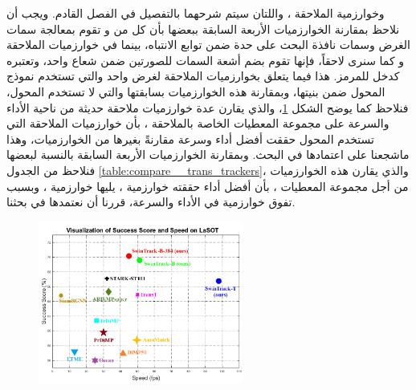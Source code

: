 وخوارزمية الملاحقة 
،
واللتان سيتم شرحهما بالتفصيل في الفصل القادم.
ويجب أن نلاحظ بمقارنة الخوارزميات الأربعة السابقة ببعضها بأن كل من 
و
تقوم بمعالجة سمات الغرض وسمات نافذة البحث على حدة ضمن توابع الانتباه، بينما في خوارزميات الملاحقة 
و
كما سنرى لاحقاً،
فإنها تقوم بضم أشعة السمات للصورتين ضمن شعاع واحد، وتعتبره كدخل للمرمز.
\newline
هذا فيما يتعلق بخوارزميات الملاحقة لغرض واحد والتي تستخدم نموذج المحول ضمن بنيتها، وبمقارنة هذه الخوارزميات بسابقتها والتي لا تستخدم المحول، فنلاحظ كما يوضح الشكل
\ref{fig:comapre}،
والذي يقارن عدة خوارزميات ملاحقة حديثة من ناحية الأداء والسرعة على مجموعة المعطيات الخاصة بالملاحقة 
،
بأن خوارزميات الملاحقة التي تستخدم المحول حققت أفضل أداء وسرعة مقارنةً بغيرها من الخوارزميات، وهذا ماشجعنا على اعتمادها في البحث.
وبمقارنة الخوارزميات الأربعة السابقة بالنسبة لبعضها فنلاحظ من الجدول 
\ref{table:compare__trans_trackers}،
والذي يقارن هذه الخوارزميات من أجل مجموعة المعطيات 
،
بأن أفضل أداء حققته خوارزمية 
، 
يليها خوارزمية 
،
وبسبب تفوق خوارزمية 
في الأداء والسرعة، قررنا أن نعتمدها في بحثنا.
\begin{figure}[!h]
	\centerline{\includegraphics[width=0.6\textwidth]{images/transformerInTrackingComapre.png}}
	\caption{
		}
	\label{fig:comapre}
\end{figure}

